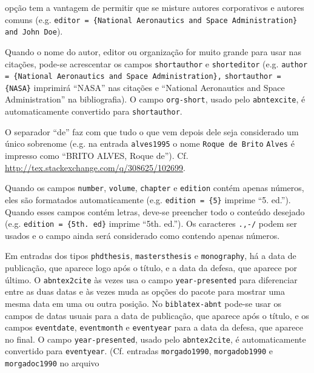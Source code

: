 \documentclass[a4paper]{article}
\begin{document}
\begin{itemize}
\begin{sloppypar}
      opção tem a vantagem de permitir que se misture autores corporativos
      e autores comuns (e.g. \texttt{editor = \{National Aeronautics and Space
      Administration\} and John Doe}).
    \item Quando o nome do autor, editor ou organização for muito grande para
      usar nas citações, pode-se acrescentar os campos \texttt{short\-author}
      e \texttt{short\-editor} (e.g. \texttt{author = \{National Aeronautics
      and Space Ad\-min\-is\-tra\-tion\},} \texttt{short\-author = \{NASA\}}
      imprimirá ``NASA'' nas citações e ``National Aeronautics and Space
      Administration'' na bibliografia). O campo \texttt{org-short}, usado
      pelo \texttt{abntex\-cite}, é automaticamente convertido para
      \texttt{shortauthor}.
    \item O separador ``de'' faz com que tudo o que vem depois dele seja
      considerado um único sobrenome (e.g. na entrada \texttt{alves1995}
      o nome \texttt{Roque de Brito} \texttt{Alves} é impresso como ``BRITO
      ALVES, Roque de''). Cf.
      \url{http://tex.stackexchange.com/q/308625/102699}.
    \item Quando os campos \texttt{number}, \texttt{volume}, \texttt{chapter}
      e \texttt{edition} contém apenas números, eles são formatados
      automaticamente (e.g. \texttt{edition = \{5\}} imprime ``5. ed.'').
      Quando esses campos contém letras, deve-se preencher todo o conteúdo
      desejado (e.g. \verb"edition = {5th. ed}" imprime ``5th. ed.''). Os
      caracteres \texttt{.,-/} podem ser usados e o campo ainda será
      considerado como contendo apenas números.
    \item Em entradas dos tipos \texttt{phdthesis}, \texttt{mastersthesis}
      e \texttt{monography}, há a data de publicação, que aparece logo após
      o título, e a data da defesa, que aparece por último.
      O \texttt{abntex2cite} às vezes usa o campo \texttt{year-presented} para
      diferenciar entre as duas datas e às vezes muda as opções do pacote para
      mostrar uma mesma data em uma ou outra posição. No
      \texttt{biblatex-abnt} pode-se usar os campos de datas usuais para
      a data de publicação, que aparece após o título, e os campos
      \texttt{eventdate}, \texttt{eventmonth} e \texttt{eventyear} para a data
      da defesa, que aparece no final. O campo \texttt{year-presented}, usado
      pelo \texttt{abntex2cite}, é automaticamente convertido para
      \texttt{eventyear}. (Cf. entradas \texttt{morgado1990},
      \texttt{morgadob1990} e \texttt{morgadoc1990} no arquivo

\end{sloppypar}
\end{itemize}
\end{document}
